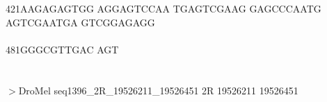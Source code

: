\documentclass[11pt,twoside,reqno,a4paper]{article}
\begin{document}
{421\hspace*{1\charwidth}AAGAGAGTGG	AGGAGTCCAA	TGAGTCGAAG	GAGCCCAATG	AGTCGAATGA	GTCGGAGAGG	\\
\hspace*{4\charwidth}\hspace*{1\charwidth}\hspace*{1\charwidth}\hspace*{1\charwidth}\hspace*{1\charwidth}\hspace*{1\charwidth}\hspace*{1\charwidth}\\
481\hspace*{1\charwidth}GGGCGTTGAC	AGT\\
\hspace*{4\charwidth}\hspace*{1\charwidth}\\
}
\\
$>$DroMel	seq1396\_2R\_19526211\_19526451	2R	19526211	19526451 \\
 \\
\end{document}
